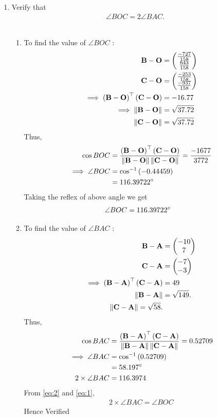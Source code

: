 \documentclass[11pt]{book}
\begin{document}
\begin{enumerate}[label=\thesection.\arabic*.,ref=\thesection.\theenumi]
\item Verify that 
\begin{align}
\angle BOC = 2\angle BAC.
\end{align}\\
 \solution
\begin{enumerate}
\item To find  the value of $\angle{BOC}$ :
\begin{align}
\mathbf{B}-\mathbf{O}
          &=\begin{pmatrix}\frac{-727}{158}\\\frac{643}{158}\end{pmatrix} \\
\mathbf{C}-\mathbf{O}
         & =\begin{pmatrix}\frac{-253}{158}\\\frac{-937}{158}\end{pmatrix}
	  \\
\implies \left(\mathbf{B}-\mathbf{O}\right)^{\top}\left(\mathbf{C}-\mathbf{O}\right)&=-16.77\\
	\implies \left\lVert\mathbf{B}-\mathbf{O}\right\rVert&= \sqrt{37.72} \\
	\left\lVert\mathbf{C}-\mathbf{O}\right\rVert &= \sqrt{37.72}
\end{align}
Thus,
\begin{align}
\cos{BOC}&=\frac{\left(\mathbf{B}-\mathbf{O}\right)^{\top}\left(\mathbf{C}-\mathbf{O}\right)}{\left\lVert\mathbf{B}-\mathbf{O}\right\rVert\left\lVert\mathbf{C}-\mathbf{O}\right\rVert}
=\frac{-1677}{3772}\\
\implies\angle{BOC}&=\cos^{-1}\left(-0.44459\right)
\\
	&=116.39722\degree
\end{align}
Taking the reflex of above angle we get 
\begin{align}
    \angle{BOC}&=116.39722\degree
\end{align}
	\item To find  the value of $\angle{BAC}$ :
\begin{align}
\mathbf{B}-\mathbf{A}&=\begin{pmatrix}-10\\7\end{pmatrix} \\
\mathbf{C}-\mathbf{A}&=\begin{pmatrix}-7\\-3\end{pmatrix}
\\
\implies \left(\mathbf{B}-\mathbf{A}\right)^{\top}\left(\mathbf{C}-\mathbf{A}\right)&=49
\\
	\left\lVert\mathbf{B}-\mathbf{A}\right\rVert&= \sqrt{149}.\\
	\left\lVert\mathbf{C}-\mathbf{A}\right\rVert= \sqrt{58}.
\end{align}
Thus,
\begin{align}
\cos{BAC}&=\frac{\brak{\vec{B}-\vec{A}}^{\top}\brak{\vec{C}-\vec{A}}}{\norm{\vec{B}-\vec{A}}\norm{\vec{C}-\vec{A}}}
=0.52709\\
\implies\angle{BAC}&=\cos^{-1}\brak{0.52709}\\
&=58.197\degree \label{eq:2}  \\
2\times\angle{BAC} &= 116.3974
\end{align}
From \eqref{eq:2} and \eqref{eq:1},
\begin{align}
2\times\angle{BAC}
= \angle{BOC}
\end{align}
Hence Verified
\end{enumerate}


\end{enumerate}
\end{document}
